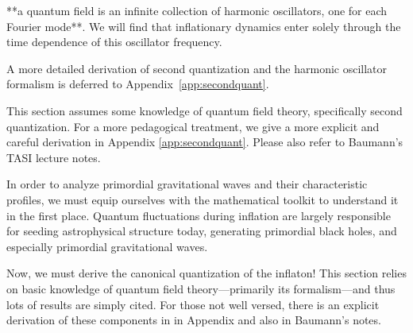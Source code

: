 
**a quantum field is an infinite collection of harmonic oscillators, one for each Fourier mode**. We will find that inflationary dynamics enter solely through the time dependence of this oscillator frequency.

A more detailed derivation of second quantization and the harmonic oscillator formalism is deferred to Appendix~\ref{app:secondquant}.


This section assumes some knowledge of quantum field theory, specifically second quantization. For a more pedagogical treatment, we give a more explicit and careful derivation in Appendix \ref{app:secondquant}. Please also refer to Baumann's TASI lecture notes. 





In order to analyze primordial gravitational waves and their characteristic profiles, we must equip ourselves with the mathematical toolkit to understand it in the first place. Quantum fluctuations during inflation are largely responsible for seeding astrophysical structure today, generating primordial black holes, and especially primordial gravitational waves. 




Now, we must derive the canonical quantization of the inflaton! This section relies on basic knowledge of quantum field theory—primarily its formalism—and thus lots of results are simply cited. For those not well versed, there is an explicit derivation of these components in in Appendix  and also in Baumann's notes.


